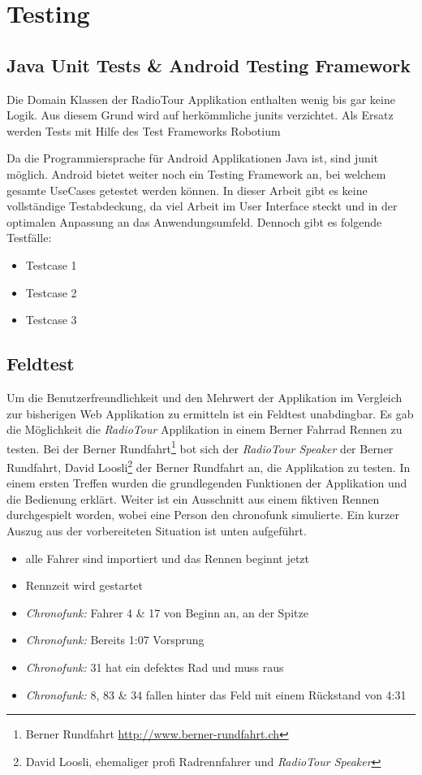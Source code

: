 \chapter{Testing}

\section{Java Unit Tests \& Android Testing Framework}
Die Domain Klassen der RadioTour Applikation enthalten wenig bis gar keine Logik. Aus diesem Grund wird auf herkömmliche \glspl{junit} verzichtet. Als Ersatz werden Tests mit Hilfe des Test Frameworks Robotium 


Da die Programmiersprache für Android Applikationen Java ist, sind \gls{junit} möglich. Android bietet weiter noch ein Testing Framework an, bei welchem gesamte UseCases getestet werden können. In dieser Arbeit gibt es keine vollständige Testabdeckung, da viel Arbeit im User Interface steckt und in der optimalen Anpassung an das Anwendungsumfeld. Dennoch gibt es folgende Testfälle:

\begin{itemize}
\item Testcase 1
\item Testcase 2
\item Testcase 3
\end{itemize}

\section{Feldtest}
Um die Benutzerfreundlichkeit und den Mehrwert der Applikation im Vergleich zur bisherigen Web Applikation zu ermitteln ist ein Feldtest unabdingbar. Es gab die Möglichkeit die \textit{RadioTour} Applikation in einem Berner Fahrrad Rennen zu testen. Bei der Berner Rundfahrt\footnote{Berner Rundfahrt \url{http://www.berner-rundfahrt.ch}} bot sich der  \textit{RadioTour Speaker} der Berner Rundfahrt, David Loosli\footnote{David Loosli, ehemaliger profi Radrennfahrer und \textit{RadioTour Speaker}} der Berner Rundfahrt an, die Applikation zu testen. In einem ersten Treffen wurden die grundlegenden Funktionen der Applikation und die Bedienung erklärt. Weiter ist ein Ausschnitt aus einem fiktiven Rennen durchgespielt worden, wobei eine Person den \gls{chronofunk} simulierte. Ein kurzer Auszug aus der vorbereiteten Situation ist unten aufgeführt.

\begin{itemize}
\item alle Fahrer sind importiert und das Rennen beginnt jetzt
\item Rennzeit wird gestartet
\item \textit{Chronofunk:} Fahrer 4 \& 17 von Beginn an, an der Spitze
\item \textit{Chronofunk:} Bereits 1:07 Vorsprung
\item \textit{Chronofunk:} 31 hat ein defektes Rad und muss raus
\item \textit{Chronofunk:} 8, 83 \& 34 fallen hinter das Feld mit einem Rückstand von 4:31
\end{itemize}

